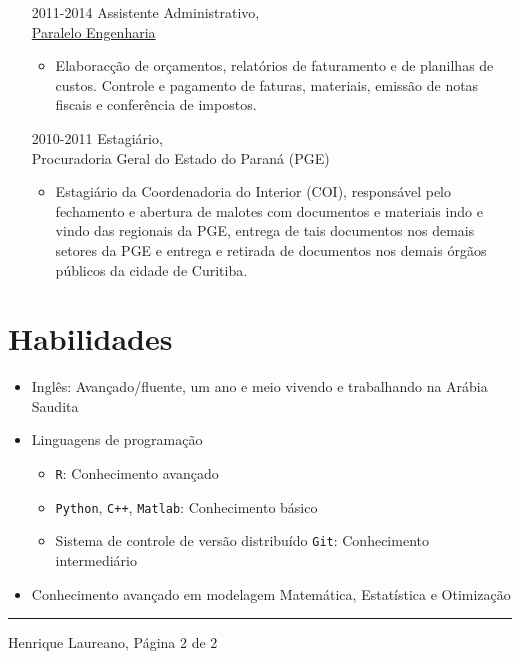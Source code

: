 \message{ !name(vitae.tex)}\documentclass[12pt]{article}
\newcommand{\horrule}[1]{\noindent\rule{\linewidth}{#1}}
\begin{document}
\begin{itemize}
 \item[2011-2014] Assistente Administrativo,\\
                  \href{https://paralelo.eng.br/}{\color{blue}Paralelo Engenharia}
  \begin{itemize}
   \item Elaborac\c{c}\~{a}o de or\c{c}amentos, relat\'{o}rios de
         faturamento e de planilhas de custos. Controle e pagamento de
         faturas, materiais, emiss\~{a}o de notas fiscais e
         confer\^{e}ncia de impostos.
  \end{itemize}

 \item[2010-2011] Estagi\'{a}rio,\\
                  Procuradoria Geral do Estado do Paran\'{a} (PGE)
  \begin{itemize}
   \item Estagi\'{a}rio da Coordenadoria do Interior (COI),
         respons\'{a}vel pelo fechamento e abertura de malotes com
         documentos e materiais indo e vindo das regionais da PGE,
         entrega de tais documentos nos demais setores da PGE e entrega
         e retirada de documentos nos demais \'{o}rg\~{a}os p\'{u}blicos
         da cidade de Curitiba.
  \end{itemize}
\end{itemize}

\section*{Habilidades}

\begin{itemize}
 \item Ingl\^{e}s: Avan\c{c}ado/fluente, um ano e meio vivendo e
       trabalhando na Ar\'{a}bia Saudita
 \item Linguagens de programa\c{c}\~{a}o
  \begin{itemize}
   \item \texttt{R}: Conhecimento avan\c{c}ado
   \item \texttt{Python}, \texttt{C++}, \texttt{Matlab}: Conhecimento
          b\'{a}sico
   \item Sistema de controle de vers\~{a}o distribu\'{i}do \texttt{Git}:
         Conhecimento intermedi\'{a}rio
  \end{itemize}
 \item Conhecimento avan\c{c}ado em modelagem Matem\'{a}tica,
       Estat\'{i}stica e Otimiza\c{c}\~{a}o
\end{itemize}

\vspace{\fill}
\horrule{1pt}
\noindent Henrique Laureano, \hfill P\'{a}gina 2 de 2
\end{document}
